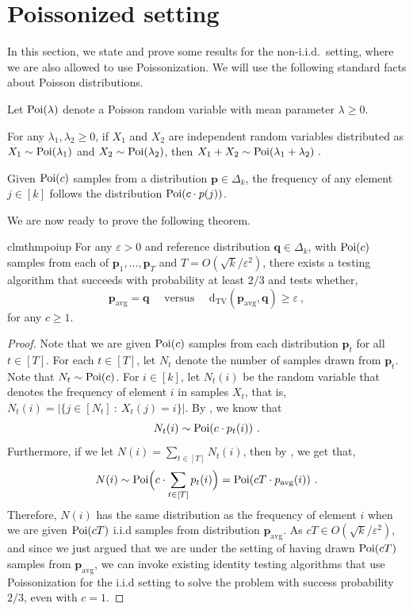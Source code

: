 \documentclass[10pt]{article} %
\def\eps{{\varepsilon}}
\theoremstyle{plain}
\newcommand{\bp}{\textbf{p}}
\newcommand{\bq}{\textbf{q}}
\newcommand{\dtv}{\mathrm{d_{TV}}}
\newcommand{\avg}{\mathrm{avg}}
\begin{document}
\section{Poissonized setting}
\label{app:poisson_identity}

In this section, we state and prove some results for the non-i.i.d.\ setting, where we are also allowed to use Poissonization. We will use the following standard facts about Poisson distributions. 

Let $\mathrm{Poi}(\lambda)$ denote a Poisson random variable with mean parameter $\lambda \geq 0$. 
\begin{fact}\label{lem:poi1}
	For any $\lambda_1,\lambda_2 \geq 0$, if $X_1$ and $X_2$ are independent random variables distributed as 
	$X_1 \sim \mathrm{Poi}(\lambda_1)$ and $X_2 \sim \mathrm{Poi}(\lambda_2)$, then $X_1+X_2 \sim \mathrm{Poi}(\lambda_1+\lambda_2)~.$
\end{fact}
\begin{fact}\label{lem:poi2}
	Given $\mathrm{Poi}(c)$ samples from a distribution $\bp \in \Delta_k$, the frequency of any element $j \in [k]$ follows the distribution $\poi(c \cdot \bp(j))$.
\end{fact}
We are now ready to prove the following theorem.

\begin{restatable}{clm}{thmpoiup}
	\label{thm:poiup}
	For any $\eps>0$ and reference distribution $\bq \in \Delta_k$, with $\mathrm{Poi}(c)$ samples from each of $\bp_1,\dots,\bp_T$ and $T=O(\sqrt{k}/\eps^2)$, there exists a testing algorithm that succeeds with probability at least $2/3$ and tests whether,
	$$\bp_{\avg} =\bq \quad \text{ versus } \quad \dtv(\bp_{\avg},\bq) \geq \eps~,$$
	for any $c \ge 1$.
\end{restatable}

\begin{proof}
	Note that we are given $\mathrm{Poi}(c)$ samples from each distribution $\bp_t$ for all $t \in [T]$. For each $t \in [T]$, let $N_t$ denote the number of samples drawn from $\bp_t$. Note that $N_t \sim \mathrm{Poi}(c)$. For $i \in [k]$, let $N_t(i)$ be the random variable that denotes the frequency of element $i$ in samples $X_t$, that is, $N_t(i)=|\{j \in [N_t]~:~X_t(j)=i \}|$. By , we know that
	$$N_t(i)\sim \poi(c\cdot \bp_t(i))~.$$
	Furthermore, if we let $N(i)=\sum_{t \in [T]}N_t(i)$, then by , we get that,
	$$N(i)\sim \poi\Big(c\cdot \sum_{t\in [T]}\bp_t(i)\Big)= \poi(cT\cdot \bp_{\avg}(i))~.$$
	Therefore, $N(i)$ has the same distribution as the frequency of element $i$ when we are given $\mathrm{Poi}(cT)$ i.i.d samples from distribution $\bp_{\avg}$.  As $cT \in O(\sqrt{k}/\eps^2)$, and since we just argued that we are under the setting of having drawn $\mathrm{Poi}(cT)$ samples from $\bp_{\avg}$, we can invoke existing identity testing algorithms that use Poissonization for the i.i.d setting 
	to solve the problem with success probability $2/3$, even with $c=1$.
\end{proof}
\end{document}
